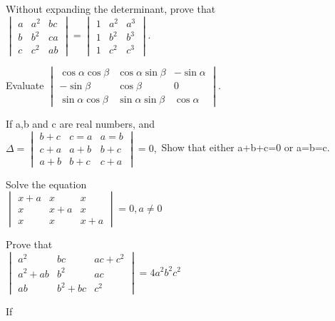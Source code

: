 \item Without expanding the determinant, prove that\\ $\begin{vmatrix}
a&a^2&bc \\ b&b^2&ca \\c&c^2&ab
\end{vmatrix}=\begin{vmatrix}
1&a^2&a^3 \\ 1&b^2&b^3 \\ 1&c^2&c^3
\end{vmatrix}$.
\\
\solution
%
\item Evaluate 
$\begin{vmatrix}
\cos\alpha \cos\beta &\cos\alpha \sin\beta &-\sin\alpha \\ -\sin\beta & \cos\beta &0 \\ \sin\alpha\cos\beta&\sin\alpha\sin\beta&\cos\alpha
\end{vmatrix}.$\\
\solution 

\item If a,b and c are real numbers, and \\$\Delta=\begin{vmatrix}
b+c&c=a&a=b \\ c+a&a+b&b+c \\ a+b&b+c&c+a
\end{vmatrix}=0,$ Show that either a+b+c=0 or a=b=c.\\
\solution 

\item Solve the equation\\ $\begin{vmatrix}
x+a&x&x \\ x&x+a&x \\ x&x&x+a
\end{vmatrix}=0, a\neq0$\\
\solution 

\item Prove that \\
$\begin{vmatrix}
a^2&bc&ac+c^2 \\ a^2+ab&b^2&ac \\ab&b^2+bc&c^2
\end{vmatrix}= 4a^2b^2c^2$\\
\solution 

\item If \\

